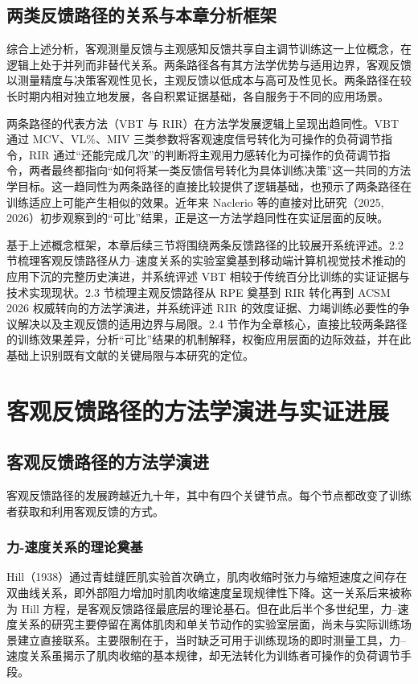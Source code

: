 \documentclass[UTF8,zihao=-4,twoside,openany]{ctexbook}
\begin{document}
\subsection{两类反馈路径的关系与本章分析框架}
综合上述分析，客观测量反馈与主观感知反馈共享自主调节训练这一上位概念，在逻辑上处于并列而非替代关系。两条路径各有其方法学优势与适用边界，客观反馈以测量精度与决策客观性见长，主观反馈以低成本与高可及性见长。两条路径在较长时期内相对独立地发展，各自积累证据基础，各自服务于不同的应用场景。

两条路径的代表方法（VBT 与 RIR）在方法学发展逻辑上呈现出趋同性。VBT 通过 MCV、VL\%、MIV 三类参数将客观速度信号转化为可操作的负荷调节指令，RIR 通过“还能完成几次”的判断将主观用力感转化为可操作的负荷调节指令，两者最终都指向“如何将某一类反馈信号转化为具体训练决策”这一共同的方法学目标。这一趋同性为两条路径的直接比较提供了逻辑基础，也预示了两条路径在训练适应上可能产生相似的效果。近年来 Naclerio 等的直接对比研究（2025, 2026）初步观察到的“可比”结果，正是这一方法学趋同性在实证层面的反映。

基于上述概念框架，本章后续三节将围绕两条反馈路径的比较展开系统评述。2.2 节梳理客观反馈路径从力--速度关系的实验室奠基到移动端计算机视觉技术推动的应用下沉的完整历史演进，并系统评述 VBT 相较于传统百分比训练的实证证据与技术实现现状。2.3 节梳理主观反馈路径从 RPE 奠基到 RIR 转化再到 ACSM 2026 权威转向的方法学演进，并系统评述 RIR 的效度证据、力竭训练必要性的争议解决以及主观反馈的适用边界与局限。2.4 节作为全章核心，直接比较两条路径的训练效果差异，分析“可比”结果的机制解释，权衡应用层面的边际效益，并在此基础上识别既有文献的关键局限与本研究的定位。

\section{客观反馈路径的方法学演进与实证进展}

\subsection{客观反馈路径的方法学演进}
客观反馈路径的发展跨越近九十年，其中有四个关键节点。每个节点都改变了训练者获取和利用客观反馈的方式。

\subsubsection{力-速度关系的理论奠基}
Hill（1938）通过青蛙缝匠肌实验首次确立，肌肉收缩时张力与缩短速度之间存在双曲线关系，即外部阻力增加时肌肉收缩速度呈现规律性下降。这一关系后来被称为 Hill 方程，是客观反馈路径最底层的理论基石。但在此后半个多世纪里，力--速度关系的研究主要停留在离体肌肉和单关节动作的实验室层面，尚未与实际训练场景建立直接联系。主要限制在于，当时缺乏可用于训练现场的即时测量工具，力--速度关系虽揭示了肌肉收缩的基本规律，却无法转化为训练者可操作的负荷调节手段。
\end{document}
